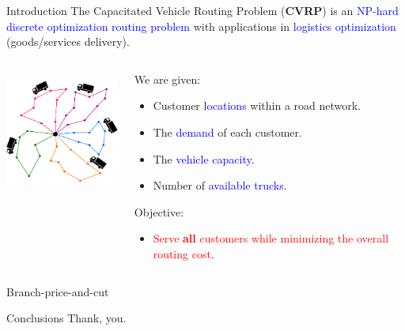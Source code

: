 \begin{frame}
	\maketitle
\end{frame}

\begin{frame}{Introduction}
	The Capacitated Vehicle Routing Problem (\textbf{CVRP}) is an \textcolor{blue}{NP-hard discrete optimization routing problem} with applications in \textcolor{blue}{logistics optimization} (goods/services delivery).

	\vspace{0.5cm}

	\begin{columns}
		\begin{column}{.35\textwidth}
			\centering
			\includegraphics[height=4cm]{Imgs/CVRP-example.cropped.pdf}
		\end{column}
		\begin{column}{.65\textwidth}
			We are given:
			\begin{itemize}
				\item Customer \textcolor{blue}{locations} within a road network.
				\item The \textcolor{blue}{demand} of each customer.
				\item The \textcolor{blue}{vehicle capacity}.
				\item Number of \textcolor{blue}{available trucks}.
			\end{itemize}
			Objective:
			\begin{itemize}
				\item \textcolor{red}{Serve \textbf{all} customers while minimizing the overall routing cost}.
			\end{itemize}
		\end{column}
	\end{columns}

\end{frame}

\begin{frame}{Branch-price-and-cut}
\end{frame}

\begin{frame}{Conclusions}
	Thank, you.

	\cite{jepsen2014}
\end{frame}

\begin{frame}
	\maketitle
\end{frame}
